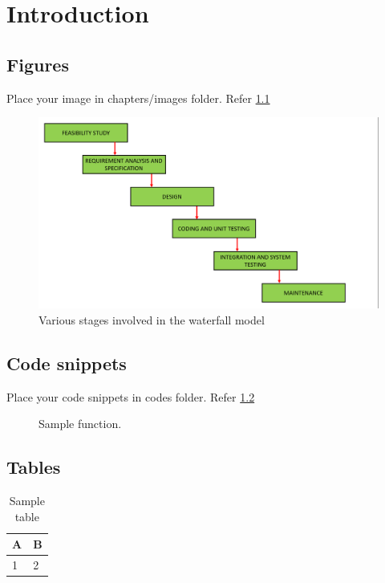\chapter{Introduction}

\section{Figures}

Place your image in chapters/images folder. Refer \ref{fig:waterfall}
\begin{figure}
    \centering
    \includegraphics[scale=0.15]{chapters/images/waterfall.png}
    \caption{Various stages involved in the waterfall model}
    \label{fig:waterfall}
\end{figure}

\section{Code snippets}
Place your code snippets in codes folder. Refer \ref{fig:sample_code} 
\begin{figure}
    
    \caption{Sample function.}
    \label{fig:sample_code}
\end{figure}

\section{Tables}
\begin{table}[h!]
    \centering
    \begin{tabular}{l|l}
        A & B \\
        \hline 
        1 & 2 
    \end{tabular}
    \caption{Sample table}
    \label{tab:highlights}
\end{table}

